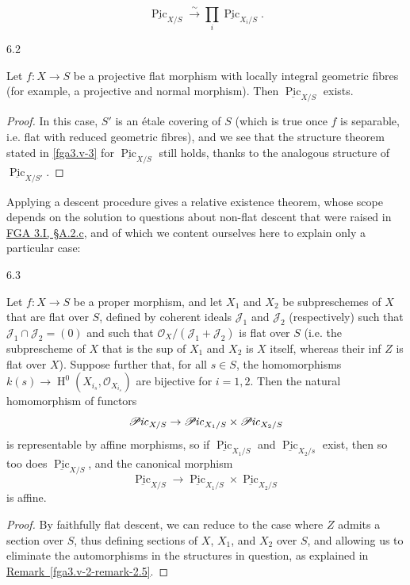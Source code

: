   \[     \underline {\operatorname {Pic}}_{X/S}     \xrightarrow {\sim } \prod _i \underline {\operatorname {Pic}}_{X_i/S}.   \]\begin{corollary}{6.2}\label{fga3.v-6-corollary-6.2}\skipsinglepar\par{}Let \(f\colon  X\to  S\) be a projective flat morphism with locally integral geometric fibres (for example, a projective and normal morphism).
    Then \(\underline {\operatorname {Pic}}_{X/S}\) exists.\begin{proof}\par{}In this case, \(S'\) is an étale covering of \(S\) (which is true once \(f\) is separable, i.e. flat with reduced geometric fibres), and we see that the structure theorem stated in \cref{fga3.v-3} for \(\underline {\operatorname {Pic}}_{X/S}\) still holds, thanks to the analogous structure of \(\underline {\operatorname {Pic}}_{X/S'}\).\end{proof}\end{corollary}\par{}Applying a descent procedure gives a relative existence theorem, whose scope depends on the solution to questions about non-flat descent that were raised in \hyperref[fga3.i-a.2.c]{FGA 3.I, §A.2.c}, and of which we content ourselves here to explain only a particular case:\begin{proposition}{6.3}\label{fga3.v-6-proposition-6.3}\skipsinglepar\par{}Let \(f\colon  X\to  S\) be a proper morphism, and let \(X_1\) and \(X_2\) be subpreschemes of \(X\) that are flat over \(S\), defined by coherent ideals \(\mathscr {J}_1\) and \(\mathscr {J}_2\) (respectively) such that \(\mathscr {J}_1\cap \mathscr {J}_2=(0)\) and such that \(\mathcal {O}_X/(\mathscr {J}_1+\mathscr {J}_2)\) is flat over \(S\) (i.e. the subprescheme of \(X\) that is the sup of \(X_1\) and \(X_2\) is \(X\) itself, whereas their inf \(Z\) is flat over \(X\)).
    Suppose further that, for all \(s\in  S\), the homomorphisms \(k(s)\to \operatorname {H}^0(X_{i_s},\mathcal {O}_{X_{i_s}})\) are bijective for \(i=1,2\).
    Then the natural homomorphism of functors
    \[       \mathscr {P}\kern  -1pt\mathit {ic}_{X/S}       \to  \mathscr {P}\kern  -1pt\mathit {ic}_{X_1/S} \times  \mathscr {P}\kern  -1pt\mathit {ic}_{X_2/S}     \]
    is representable by affine morphisms, so if \(\underline {\operatorname {Pic}}_{X_1/S}\) and \(\underline {\operatorname {Pic}}_{X_2/s}\) exist, then so too does \(\underline {\operatorname {Pic}}_{X/S}\), and the canonical morphism
    \[       \underline {\operatorname {Pic}}_{X/S}       \to  \underline {\operatorname {Pic}}_{X_1/S} \times  \underline {\operatorname {Pic}}_{X_2/S}     \]
    is affine.\begin{proof}\par{}By faithfully flat descent, we can reduce to the case where \(Z\) admits a section over \(S\), thus defining sections of \(X\), \(X_1\), and \(X_2\) over \(S\), and allowing us to eliminate the automorphisms in the structures in question, as explained in \hyperref[fga3.v-2-remark-2.5]{Remark~\ref*{fga3.v-2-remark-2.5}}.
      

\end{proof}
\end{proposition}
